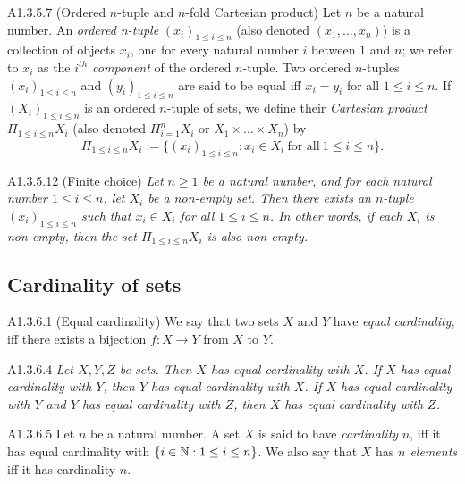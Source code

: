 \begin{definition}{A1.3.5.7}
    (Ordered $n$-tuple and $n$-fold Cartesian product) Let $n$ be a natural number. An \emph{ordered n-tuple}
    $(x_i)_{1\leq i \leq n}$ (also denoted $(x_1, \dots, x_n)$) is a collection of objects $x_i$, one for every natural
    number $i$ between $1$ and $n$; we refer to $x_i$ as the \emph{$i^{th}$ component} of the ordered $n$-tuple. Two
    ordered $n$-tuples $(x_i)_{1\leq i \leq n}$ and $(y_i)_{1\leq i \leq n}$ are said to be equal iff $x_i = y_i$ for
    all $1\leq i\leq n$. If $(X_i)_{1\leq i\leq n}$ is an ordered $n$-tuple of sets, we define their \emph{Cartesian
    product} $\Pi _{1\leq i\leq n} X_i$ (also denoted $\Pi _{i=1} ^{n} X_i$ or $X_1 \times \dots \times X_n$) by
    \begin{align*}
        \Pi _{1\leq i\leq n} X_i := \{(x_i)_{1\leq i\leq n}:x_i\in X_i~\text{for all}~1\leq i\leq n\}.
    \end{align*}
\end{definition}

\begin{lemma}{A1.3.5.12}
    (Finite choice) \emph{Let $n\geq 1$ be a natural number, and for each natural number $1\leq i\leq n$, let $X_i$ be
    a non-empty set. Then there exists an $n$-tuple $(x_i)_{1\leq i\leq n}$ such that $x_i\in X_i$ for all
    $1\leq i\leq n$. In other words, if each $X_i$ is non-empty, then the set $\Pi _{1\leq i\leq n} X_i$ is also
    non-empty.}
\end{lemma}


\subsection{Cardinality of sets}
\begin{definition}{A1.3.6.1}
    (Equal cardinality) We say that two sets $X$ and $Y$ have \emph{equal cardinality}, iff there exists a
    bijection $f: X\rightarrow Y$ from $X$ to $Y$.
\end{definition}

\begin{proposition}{A1.3.6.4}
    \emph{Let $X, Y, Z$ be sets. Then $X$ has equal cardinality with $X$. If $X$ has equal cardinality with $Y$, then $Y$
    has equal cardinality with $X$. If $X$ has equal cardinality with $Y$ and $Y$ has equal cardinality with $Z$, then
    $X$ has equal cardinality with $Z$.}
\end{proposition}

\begin{definition}{A1.3.6.5}
    Let $n$ be a natural number. A set $X$ is said to have \emph{cardinality} $n$, iff it has equal cardinality with
    $\{i\in \mathbb{N} : 1\leq i\leq n\}$. We also say that $X$ has \emph{$n$ elements} iff it has cardinality $n$.
\end{definition}

